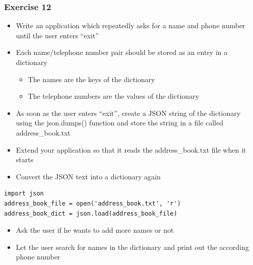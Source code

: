 \documentclass[10pt, a4paper]{beamer} %
\begin{document}
{
\bfseries
\begin{frame}\frametitle{Exercise 12}
    
\begin{itemize}
\item Write an application which repeatedly asks for a name and phone
number until the user enters ``exit''
\item Each name/telephone number pair should be stored as an entry in a dictionary
\begin{itemize}
    \item The names are the keys of the dictionary
    \item The telephone numbers are the values of the dictionary
\end{itemize}
\item As soon as the user enters ``exit'', create a JSON string of the dictionary using the json.dumps() function and store the string in a file called address\_book.txt
\end{itemize}

\framebreak

\begin{itemize}
\item Extend your application so that it reads the address\_book.txt file when it starts
\item Convert the JSON text into a dictionary again
\end{itemize}

{
\mdseries
{}
\begin{lstlisting}
import json
address_book_file = open('address_book.txt', 'r')
address_book_dict = json.load(address_book_file)
\end{lstlisting}
}

\begin{itemize}
\item Ask the user if he wants to add more names or not
\item Let the user search for names in the dictionary and print out the according phone number
\end{itemize}

\end{frame}
}
\end{document}
